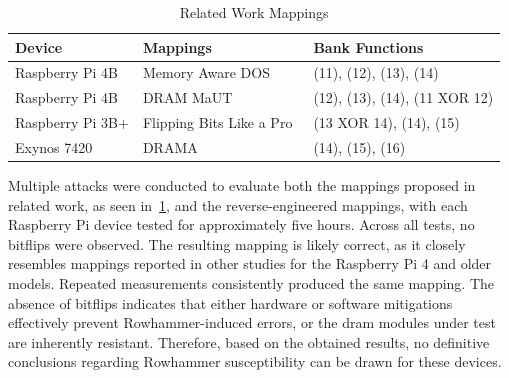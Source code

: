         \begin{table}[ht]
            \centering
            \begin{tabular}{lll}
                \hline
                Device & Mappings & Bank Functions \\
                \hline
                Raspberry Pi 4B & Memory Aware DOS~\cite{paperMemoryAware} & (11), (12), (13), (14) \\
                Raspberry Pi 4B & DRAM MaUT~\cite{paperDRAMMaUT} & (12), (13), (14), (11 XOR 12) \\
                Raspberry Pi 3B+ & Flipping Bits Like a Pro~\cite{paperProFlipping} & (13 XOR 14), (14), (15) \\
                Exynos 7420 & DRAMA~\cite{paperDRAMA} & (14), (15), (16) \\
                \hline
            \end{tabular}
            \caption{Related Work Mappings}
            \label{tab:mappings}
        \end{table}

        Multiple attacks were conducted to evaluate both the mappings proposed in related work, as seen in~\cref{tab:mappings}, and the 
        reverse-engineered mappings, with each Raspberry Pi device tested for approximately five hours.
        Across all tests, no bitflips were observed. The resulting mapping is likely correct, as it 
        closely resembles mappings reported in other studies for the Raspberry Pi 4 and older models. 
        Repeated measurements consistently produced the same mapping.
        The absence of bitflips indicates that either hardware or software mitigations effectively 
        prevent Rowhammer-induced errors, or the \gls{dram} modules under test are inherently resistant. 
        Therefore, based on the obtained results, no definitive conclusions regarding Rowhammer 
        susceptibility can be drawn for these devices.
